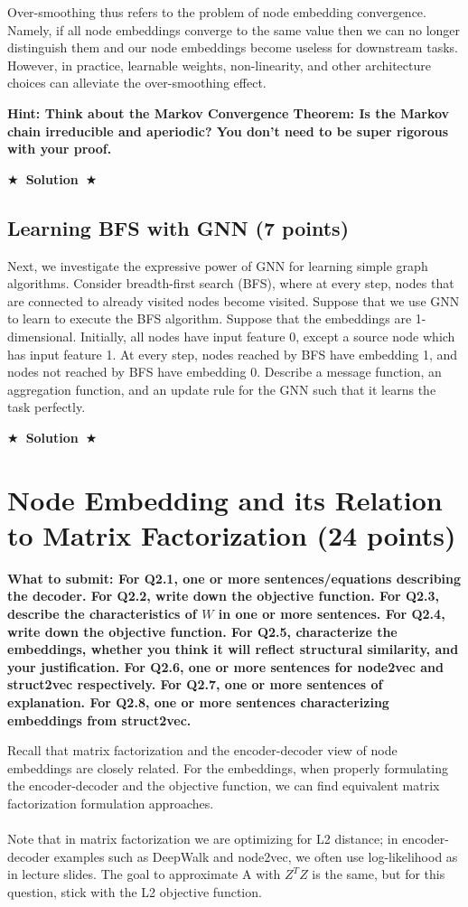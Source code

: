 \documentclass{article}
\numberwithin{figure}{section}
\newcommand{\Solution}[1]{{\medskip \color{red} \bf $\bigstar$~\sf \textbf{Solution}~$\bigstar$ \sf #1 } \bigskip}
\begin{document}
Over-smoothing thus refers to the problem of node embedding convergence. Namely, if all node embeddings converge to the same value then we can no longer distinguish them and our node embeddings become useless for downstream tasks. However, in practice, learnable weights, non-linearity, and other architecture choices can alleviate the over-smoothing effect.

\textbf{Hint: Think about the Markov Convergence Theorem: Is the Markov chain irreducible and aperiodic? You don’t need to be super rigorous with your proof.}

\Solution{}


\subsection{Learning BFS with GNN (7 points)}

Next, we investigate the expressive power of GNN for learning simple graph algorithms. Consider breadth-first search (BFS), where at every step, nodes that are connected to already visited nodes become visited. Suppose that we use GNN to learn to execute the BFS algorithm. Suppose that the embeddings are 1-dimensional. Initially, all nodes have input feature 0, except a source node which has input feature 1. At every step, nodes reached by BFS have embedding 1, and nodes not reached by BFS have embedding 0. Describe a message function, an aggregation function, and an update rule for the GNN such that it learns the task perfectly.

\Solution{}



\section{Node Embedding and its Relation to Matrix Factorization (24 points)}

\textbf{ What to submit: For Q2.1, one or more sentences/equations describing the decoder. For Q2.2, write down the objective function. For Q2.3, describe the characteristics of $W$ in one or more sentences. For Q2.4, write down the objective function. For Q2.5, characterize the embeddings, whether you think it will reflect structural similarity, and your justification. For Q2.6, one or more sentences for node2vec and struct2vec respectively. For Q2.7, one or more sentences of explanation. For Q2.8, one or more sentences characterizing embeddings from struct2vec.}

Recall that matrix factorization and the encoder-decoder view of node embeddings are closely related. For the embeddings, when properly formulating the encoder-decoder and the objective function, we can find equivalent matrix factorization formulation approaches.\\
\\
    Note that in matrix factorization we are optimizing for L2 distance; in encoder-decoder examples such as DeepWalk and node2vec, we often use log-likelihood as in lecture slides. The goal to approximate A with $Z^TZ$ is the same, but for this question, stick with the L2 objective function.
\end{document}
